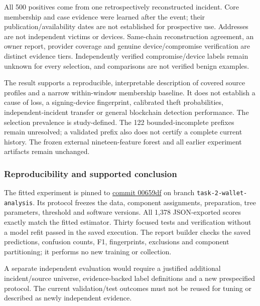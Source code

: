 All 500 positives come from one retrospectively reconstructed incident.
Core membership and case evidence were learned after the event; their
publication/availability dates are not established for prospective use.
Addresses are not independent victims or devices. Same-chain
reconstruction agreement, an owner report, provider coverage and genuine
device/compromise verification are distinct evidence tiers.
Independently verified compromise/device labels remain unknown for every
selection, and comparisons are not verified benign examples.

The result supports a reproducible, interpretable description of covered
source profiles and a narrow within-window membership baseline. It does
not establish a cause of loss, a signing-device fingerprint, calibrated
theft probabilities, independent-incident transfer or general blockchain
detection performance. The selection prevalence is study-defined. The
122 bounded-incomplete prefixes remain unresolved; a validated prefix
also does not certify a complete current history. The frozen external
nineteen-feature forest and all earlier experiment artifacts remain
unchanged.

\hypertarget{reproducibility-and-supported-conclusion}{%
\subsubsection{Reproducibility and supported
conclusion}\label{reproducibility-and-supported-conclusion}}

The fitted experiment is pinned to
\href{https://github.com/HnsHugo/STAGE-UFU/commit/00659df35d3140143fa12b37ba35ea56722a4854}{commit
00659df} on branch \texttt{task-\allowbreak{}2-\allowbreak{}wallet-\allowbreak{}analysis}. Its protocol freezes
the data, component assignments, preparation, tree parameters, threshold
and software versions. All 1,378 JSON-exported scores exactly match the
fitted estimator. Thirty focused tests and verification without a model
refit passed in the saved execution. The report builder checks the saved
predictions, confusion counts, F1, fingerprints, exclusions and
component partitioning; it performs no new training or collection.

A separate independent evaluation would require a justified additional
incident/source universe, evidence-backed label definitions and a new
prespecified protocol. The current validation/test outcomes must not be
reused for tuning or described as newly independent evidence.

\endgroup
